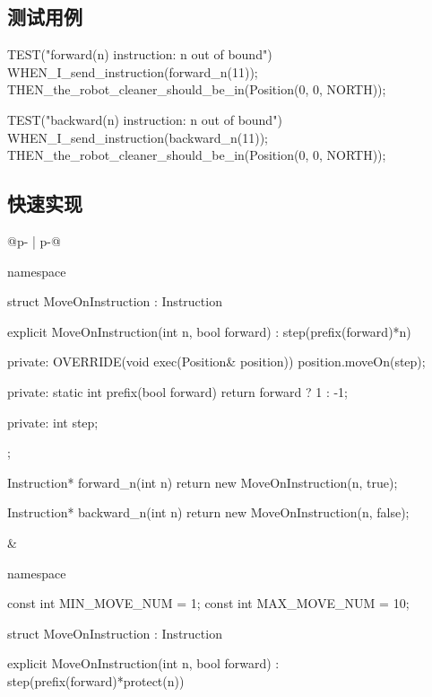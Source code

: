 \begin{content}

\subsection{测试用例}

\begin{leftbar}
\begin{c++}[caption={src/robot-cleaner/Instruction.cpp}]
TEST("forward(n) instruction: n out of bound")
{
    WHEN_I_send_instruction(forward_n(11));
    THEN_the_robot_cleaner_should_be_in(Position(0, 0, NORTH));
}

TEST("backward(n) instruction: n out of bound")
{
    WHEN_I_send_instruction(backward_n(11));
    THEN_the_robot_cleaner_should_be_in(Position(0, 0, NORTH));
}
\end{c++}
\end{leftbar}

\subsection{快速实现}

\begin{tabular}{@{}p{} 
                 | p{}@{}}
\begin{c++}[caption={src/robot-cleaner/Instruction.cpp}]
namespace
{
    struct MoveOnInstruction : Instruction
    {
        explicit MoveOnInstruction(int n, bool forward)
          : step(prefix(forward)*n)
        {}

    private:
        OVERRIDE(void exec(Position& position))
        {
            position.moveOn(step);
        }

    private:
        static int prefix(bool forward)
        {
            return forward ? 1 : -1;
        }
        
    private:
        int step;
    };
}  
  
Instruction* forward_n(int n)
{
    return new MoveOnInstruction(n, true);
}

Instruction* backward_n(int n)
{
    return new MoveOnInstruction(n, false);
}
\end{c++}
&
\begin{c++}[caption={src/robot-cleaner/Instruction.cpp}]
namespace
{
    const int MIN_MOVE_NUM = 1;
    const int MAX_MOVE_NUM = 10;
    
    struct MoveOnInstruction : Instruction
    {
        explicit MoveOnInstruction(int n, bool forward)
          : step(prefix(forward)*protect(n))
        {}

}}
\end{c++}
\end{tabular}
\end{content}

